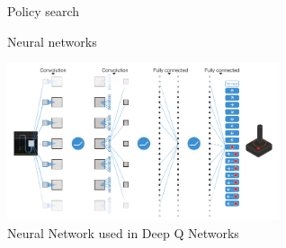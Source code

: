 \begin{frame}{\tcii{} Policy search}
\end{frame}

\begin{frame}{\tcii{} Neural networks}
    \begin{center}
      \includegraphics[width=8cm]{images/misc/dqn.png}\\
      \small Neural Network used in Deep Q Networks \cite{mnihHumanlevelControlDeep2015}
    \end{center}
\end{frame}


